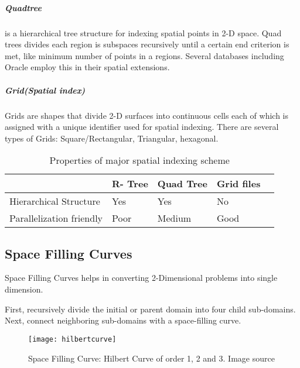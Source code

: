 \documentclass[article,type=msc,colorback,12pt,accentcolor=tud1d]{tudthesis}
\begin{document}
		   \subparagraph{Quadtree} is a hierarchical tree structure for indexing spatial points in 2-D space. Quad trees divides each region is subspaces recursively until a certain end criterion is met, like minimum number of points in a regions. Several databases including Oracle employ this in their spatial extensions.
		   
		   \subparagraph{Grid(Spatial index)} Grids are shapes that divide 2-D surfaces into continuous cells each of which is assigned with a unique identifier used for spatial indexing\cite{wiki:gridfiles_1, wiki:gridfiles}. There are several types of Grids: Square/Rectangular, Triangular, hexagonal.
		   
		   
		   \begin{table}[h]
		   	\centering
		   	\begin{tabular}[htbp]{llllc}
		   		\\	\hline 
			   	&\textbf{R- Tree} &\textbf{Quad Tree} &\textbf{Grid files}\\
			   	\hline
			   	Hierarchical Structure  &Yes   &Yes &No\\
			   	Parallelization friendly  &Poor  &Medium &Good \\
			   	
		   		\hline
		   	\end{tabular}
		   	\caption{Properties of major spatial indexing scheme \cite{siminthesis}}
		   	\label{tab:Spatial indexing}
		   \end{table}
		   
		   \clearpage
		   \subsection{Space Filling Curves}
		   
		   Space Filling Curves helps in converting 2-Dimensional problems into single dimension.
		   
		   First, recursively divide the initial or parent domain into four child sub-domains. Next, connect neighboring sub-domains with a space-filling curve.
		  
			  \hfill
			  \hfill	  
				\begin{figure}[h]
					\centering
					\texttt{[image: hilbertcurve]}
					\caption{Space Filling Curve: Hilbert Curve of order 1, 2 and 3. Image source \cite{kevinSFCthesis} }
					\label{fig:hilbertcurve}
				\end{figure}
					\hfill
					\hfill	  
		  
\end{document}

